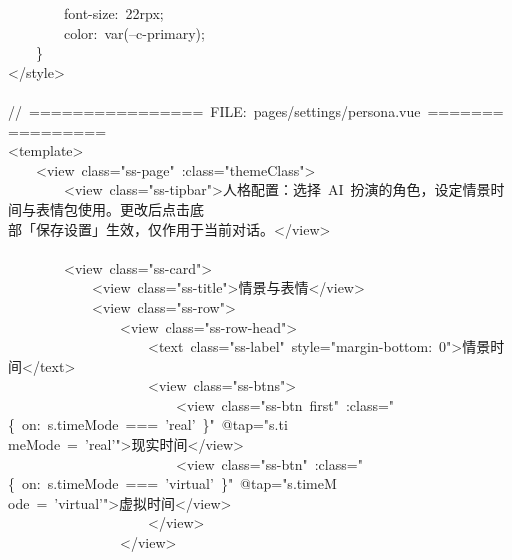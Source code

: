 \documentclass[a4paper,10pt]{article}
\begin{document}
{~~~~~~~~font-size:~22rpx;\\
~~~~~~~~color:~var(--c-primary);\\
~~~~\}\\
</style>\\
\mbox{}\\
//~================~FILE:~pages/settings/persona.vue~================\\
<template>\\
~~~~<view~class="ss-page"~:class="themeClass">\\
~~~~~~~~<view~class="ss-tipbar">人格配置：选择~AI~扮演的角色，设定情景时间与表情包使用。更改后点击底\\
部「保存设置」生效，仅作用于当前对话。</view>\\
\mbox{}\\
~~~~~~~~<view~class="ss-card">\\
~~~~~~~~~~~~<view~class="ss-title">情景与表情</view>\\
~~~~~~~~~~~~<view~class="ss-row">\\
~~~~~~~~~~~~~~~~<view~class="ss-row-head">\\
~~~~~~~~~~~~~~~~~~~~<text~class="ss-label"~style="margin-bottom:~0">情景时间</text>\\
~~~~~~~~~~~~~~~~~~~~<view~class="ss-btns">\\
~~~~~~~~~~~~~~~~~~~~~~~~<view~class="ss-btn~first"~:class="\{~on:~s.timeMode~===~'real'~\}"~@tap="s.ti\\
meMode~=~'real'">现实时间</view>\\
~~~~~~~~~~~~~~~~~~~~~~~~<view~class="ss-btn"~:class="\{~on:~s.timeMode~===~'virtual'~\}"~@tap="s.timeM\\
ode~=~'virtual'">虚拟时间</view>\\
~~~~~~~~~~~~~~~~~~~~</view>\\
~~~~~~~~~~~~~~~~</view>
}

\newpage
\end{document}
